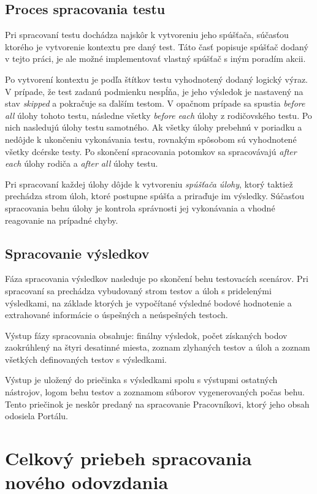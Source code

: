 \documentclass[
  digital, %
  oneside, %
  table,   %
  lof,     %
  lot,   %
]{fithesis3}
\begin{document}
\subsection{Proces spracovania testu}
\label{design-runner}

Pri spracovaní testu dochádza najskôr k vytvoreniu jeho spúšťača, súčasťou ktorého je vytvorenie kontextu pre daný test. Táto časť popisuje spúšťač dodaný v tejto práci, je ale možné implementovať vlastný spúšťač s iným poradím akcii. 

Po vytvorení kontextu je podľa štítkov testu vyhodnotený dodaný logický výraz. V prípade, že test zadanú podmienku nespĺňa, je jeho výsledok je nastavený na stav \emph{skipped} a pokračuje sa ďalším testom. V opačnom prípade sa spustia \emph{before all} úlohy tohoto testu, následne všetky \emph{before each} úlohy z rodičovského testu. Po nich nasledujú úlohy testu samotného. Ak všetky úlohy prebehnú v poriadku a nedôjde k ukončeniu vykonávania testu, rovnakým spôsobom sú vyhodnotené všetky dcérske testy. Po skončení spracovania potomkov sa spracovávajú \emph{after each} úlohy rodiča a \emph{after all} úlohy testu.

Pri spracovaní každej úlohy dôjde k vytvoreniu \emph{spúšťača úlohy}, ktorý taktiež prechádza strom úloh, ktoré postupne spúšťa a priraďuje im výsledky. Súčasťou spracovania behu úlohy je kontrola správnosti jej vykonávania a vhodné reagovanie na prípadné chyby.

\subsection{Spracovanie výsledkov}

Fáza spracovania výsledkov nasleduje po skončení behu testovacích scenárov. Pri spracovaní sa prechádza vybudovaný strom testov a úloh s pridelenými výsledkami, na základe ktorých je vypočítané výsledné bodové hodnotenie a extrahované informácie o úspešných a neúspešných testoch.

Výstup fázy spracovania obsahuje: finálny výsledok, počet získaných bodov zaokrúhlený na štyri desatinné miesta, zoznam zlyhaných testov a úloh a zoznam všetkých definovaných testov s výsledkami.

Výstup je uložený do priečinka s výsledkami spolu s výstupmi ostatných nástrojov, logom behu testov a zoznamom súborov vygenerovaných počas behu. Tento priečinok je neskôr predaný na spracovanie Pracovníkovi, ktorý jeho obsah odosiela Portálu.

\section{Celkový priebeh spracovania nového odovzdania}
\end{document}
